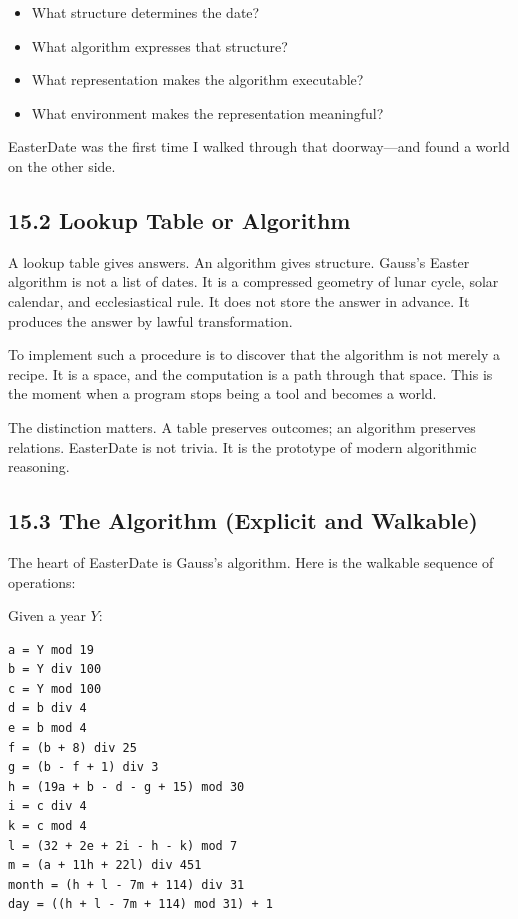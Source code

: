 \begin{itemize}
\tightlist
\item
  What structure determines the date?
\item
  What algorithm expresses that structure?
\item
  What representation makes the algorithm executable?
\item
  What environment makes the representation meaningful?
\end{itemize}

EasterDate was the first time I walked through that doorway---and found
a world on the other side.

\hypertarget{lookup-table-or-algorithm}{%
\subsection{15.2 Lookup Table or
Algorithm}\label{lookup-table-or-algorithm}}

A lookup table gives answers. An algorithm gives structure. Gauss's
Easter algorithm is not a list of dates. It is a compressed geometry of
lunar cycle, solar calendar, and ecclesiastical rule. It does not store
the answer in advance. It produces the answer by lawful transformation.

To implement such a procedure is to discover that the algorithm is not
merely a recipe. It is a space, and the computation is a path through
that space. This is the moment when a program stops being a tool and
becomes a world.

The distinction matters. A table preserves outcomes; an algorithm
preserves relations. EasterDate is not trivia. It is the prototype of
modern algorithmic reasoning.

\hypertarget{the-algorithm-explicit-and-walkable}{%
\subsection{15.3 The Algorithm (Explicit and
Walkable)}\label{the-algorithm-explicit-and-walkable}}

The heart of EasterDate is Gauss's algorithm. Here is the walkable
sequence of operations:

Given a year \(Y\):

\begin{verbatim}
a = Y mod 19
b = Y div 100
c = Y mod 100
d = b div 4
e = b mod 4
f = (b + 8) div 25
g = (b - f + 1) div 3
h = (19a + b - d - g + 15) mod 30
i = c div 4
k = c mod 4
l = (32 + 2e + 2i - h - k) mod 7
m = (a + 11h + 22l) div 451
month = (h + l - 7m + 114) div 31
day = ((h + l - 7m + 114) mod 31) + 1
\end{verbatim}

